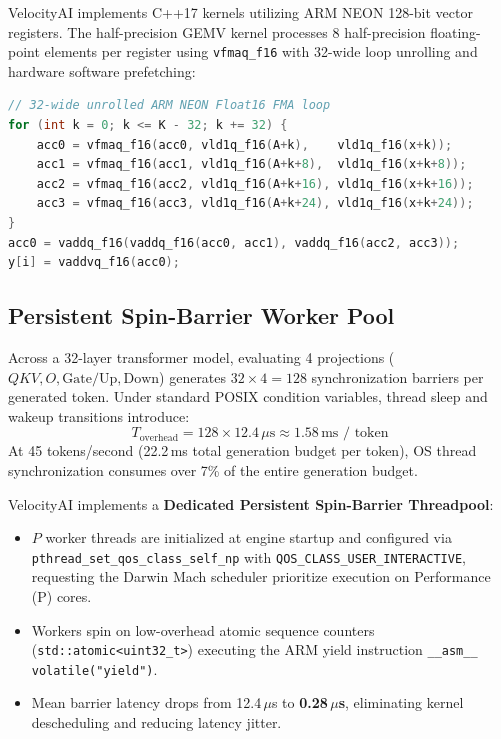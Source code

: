 \documentclass[10pt,twocolumn]{article}
\begin{document}
VelocityAI implements C++17 kernels utilizing ARM NEON 128-bit vector registers. The half-precision GEMV kernel processes 8 half-precision floating-point elements per register using \texttt{vfmaq\_f16} with 32-wide loop unrolling and hardware software prefetching:

\noindent\begin{minipage}{\columnwidth}
\begin{lstlisting}[language=C++]
// 32-wide unrolled ARM NEON Float16 FMA loop
for (int k = 0; k <= K - 32; k += 32) {
    acc0 = vfmaq_f16(acc0, vld1q_f16(A+k),    vld1q_f16(x+k));
    acc1 = vfmaq_f16(acc1, vld1q_f16(A+k+8),  vld1q_f16(x+k+8));
    acc2 = vfmaq_f16(acc2, vld1q_f16(A+k+16), vld1q_f16(x+k+16));
    acc3 = vfmaq_f16(acc3, vld1q_f16(A+k+24), vld1q_f16(x+k+24));
}
acc0 = vaddq_f16(vaddq_f16(acc0, acc1), vaddq_f16(acc2, acc3));
y[i] = vaddvq_f16(acc0);
\end{lstlisting}
\end{minipage}

\subsection{Persistent Spin-Barrier Worker Pool}
Across a 32-layer transformer model, evaluating 4 projections ($QKV, O, \text{Gate/Up}, \text{Down}$) generates $32 \times 4 = 128$ synchronization barriers per generated token. Under standard POSIX condition variables, thread sleep and wakeup transitions introduce:
\begin{equation}
T_{\text{overhead}} = 128 \times 12.4\,\mu\text{s} \approx 1.58\,\text{ms / token}
\end{equation}
At 45 tokens/second (22.2\,ms total generation budget per token), OS thread synchronization consumes over 7\% of the entire generation budget.

VelocityAI implements a \textbf{Dedicated Persistent Spin-Barrier Threadpool}:
\begin{itemize}
    \item $P$ worker threads are initialized at engine startup and configured via \texttt{pthread\_set\_qos\_class\_self\_np} with \texttt{QOS\_CLASS\_USER\_INTERACTIVE}, requesting the Darwin Mach scheduler prioritize execution on Performance (P) cores.
    \item Workers spin on low-overhead atomic sequence counters (\texttt{std::atomic<uint32\_t>}) executing the ARM yield instruction \texttt{\_\_asm\_\_ volatile("yield")}.
    \item Mean barrier latency drops from 12.4\,$\mu$s to \textbf{0.28\,$\mu$s}, eliminating kernel descheduling and reducing latency jitter.
\end{itemize}
\end{document}
